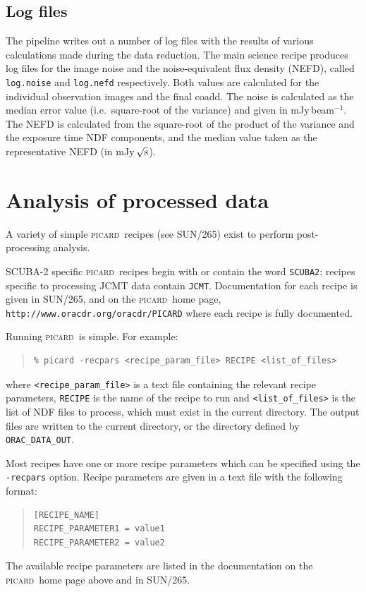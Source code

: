 \documentclass[twoside,11pt]{article}
\newcommand{\htmladdnormallink}[2]{#1}
\newcommand{\xref}[3]{#1}
\newcommand{\xlabel}[1]{}
\renewcommand{\_}{\texttt{\symbol{95}}}
\newenvironment{myquote}{\begin{quote}\begin{small}}{\end{small}\end{quote}}
\newcommand{\picard}{\textsc{picard}}
\newcommand{\picardsun}{\xref{SUN/265}{sun265}{}}
\begin{document}
\subsection{Log files}

The pipeline writes out a number of log files with the results of
various calculations made during the data reduction. The main science
recipe produces log files for the image noise and the noise-equivalent
flux density (NEFD), called \texttt{log.noise} and \texttt{log.nefd}
respectively. Both values are calculated for the individual
observation images and the final coadd. The noise is calculated as the
median error value (i.e.\ square-root of the variance) and given in
mJy\,beam$^{-1}$. The NEFD is calculated from the square-root of the
product of the variance and the exposure time NDF components, and the
median value taken as the representative NEFD (in mJy\,$\sqrt{\rm s}$).

\section{\xlabel{picard}Analysis of processed data\label{picard}}

A variety of simple \picard\ recipes (see \picardsun) exist to perform
post-processing analysis.

SCUBA-2 specific \picard\ recipes begin with or contain the word
\verb+SCUBA2+; recipes specific to processing JCMT data contain
\verb+JCMT+. Documentation for each recipe is given in \picardsun, and
on the \picard\ home page,
\htmladdnormallink{\texttt{http://www.oracdr.org/oracdr/PICARD}}{http://www.oracdr.org/oracdr/PICARD}
where each recipe is fully documented.

Running \picard\ is simple. For example:
\begin{myquote}
\begin{verbatim}
% picard -recpars <recipe_param_file> RECIPE <list_of_files>
\end{verbatim}
\end{myquote}
where \verb+<recipe_param_file>+ is a text file containing the
relevant recipe parameters, \verb+RECIPE+ is the name of the
recipe to run and \verb+<list_of_files>+ is the list of NDF files to
process, which must exist in the current directory. The output files
are written to the current directory, or the directory defined by
\verb+ORAC_DATA_OUT+.

Most recipes have one or more recipe parameters which can be specified
using the \texttt{-recpars} option. Recipe parameters are given in a
text file with the following format:
\begin{myquote}
\begin{verbatim}
[RECIPE_NAME]
RECIPE_PARAMETER1 = value1
RECIPE_PARAMETER2 = value2
\end{verbatim}
\end{myquote}
The available recipe parameters are listed in the documentation on the
\picard\ home page above and in \picardsun.
\end{document}
